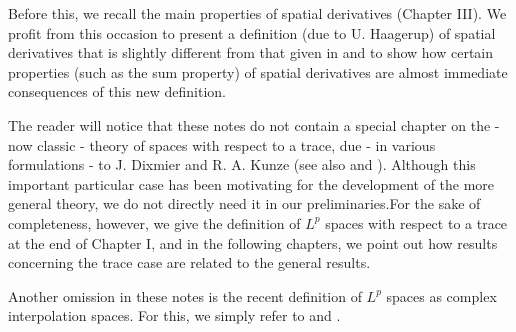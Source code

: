 Before this, we recall the main properties of spatial derivatives (Chapter III). We profit from this occasion to present a definition (due to U. Haagerup) of spatial derivatives that is slightly different from that given in \cite{1} and to show how certain properties (such as the sum property) of spatial derivatives are almost immediate consequences of this new definition.\par
The reader will notice that these notes do not contain a special chapter on the - now classic - theory of spaces with respect to a trace, due - in various formulations - to J. Dixmier \cite{3}  and R. A. Kunze \cite{12} (see also \cite{21} and \cite{13}). Although this important particular case has been motivating for the development of the more general theory, we do not directly need it in our preliminaries.For the sake of completeness, however, we give the definition of $L^p$ spaces with respect to a trace at the end of Chapter I, and in the following chapters, we point out how results concerning the trace case are related to the general results.\par
Another omission in these notes is the recent definition of $L^p$ spaces as complex interpolation spaces. For this, we simply refer to \cite{11} and \cite{20}.
% 